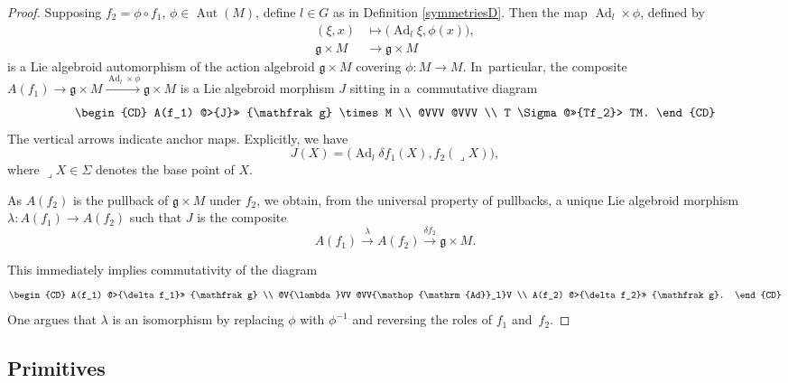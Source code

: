\documentclass[pdftex]{sigma}%
\numberwithin{equation}{section}
\DeclareMathOperator{\Adjoint}{Ad}
\DeclareMathOperator{\automorphism}{Aut}
\begin{document}
\begin{proof} Supposing $f_2 = \phi \circ f_1$, $\phi \in
\automorphism(M)$, define $l \in G$ as in Definition
\ref{symmetriesD}. Then the map $\Adjoint_l \times \phi $, defined by
 \begin{align*}
 (\xi,x) &\mapsto \big(\!\Adjoint_l \xi , \phi(x)\big),
 \\
{\mathfrak g} \times M &\rightarrow {\mathfrak g} \times M
 \end{align*}
 is a Lie algebroid automorphism of the action
algebroid ${\mathfrak g} \times M$ covering $\phi \colon M \rightarrow
M$. In~particular, the composite $A(f_1) \rightarrow {\mathfrak g}
\times M \xrightarrow{\Adjoint_l \times \phi} {\mathfrak g} \times M$
is a Lie algebroid morphism $J$ sitting in a~com\-mutative diagram
\begin{equation*}
 \begin{CD}
 A(f_1) @>{J}>> {\mathfrak g} \times M \\ @VVV @VVV \\
T \Sigma @>>{Tf_2}> TM.
 \end{CD}
\end{equation*}
The vertical arrows indicate anchor maps. Explicitly, we have
\[
J(X) = \big(\!\Adjoint_l \delta f_1 (X), f_2(\lrcorner X)\big),
\]
where $\lrcorner X \in \Sigma$ denotes the base point of $X$.

As $A(f_2)$ is the pullback of ${\mathfrak g} \times M$ under $f_2$,
we obtain, from the universal property of pullbacks, a unique Lie
algebroid morphism $\lambda \colon A(f_1) \rightarrow A(f_2)$ such
that $J $ is the composite
 \[
 A(f_1) \xrightarrow{\lambda} A(f_2) \xrightarrow{\delta f_2}
 {\mathfrak g} \times M.
 \]

This immediately implies commutativity of the diagram
\begin{equation*}
 \begin{CD} A(f_1) @>{\delta f_1}>> {\mathfrak g} \\
@V{\lambda}VV @VV{\Adjoint_l}V \\ A(f_2) @>{\delta f_2}>> {\mathfrak g}.
 \end{CD}
\end{equation*}
One argues that $\lambda$ is an isomorphism by
replacing $\phi $ with $\phi^{-1}$ and reversing the roles of $f_1$
and~$f_2$.
\end{proof}

\subsection*{Primitives}
\end{document}
